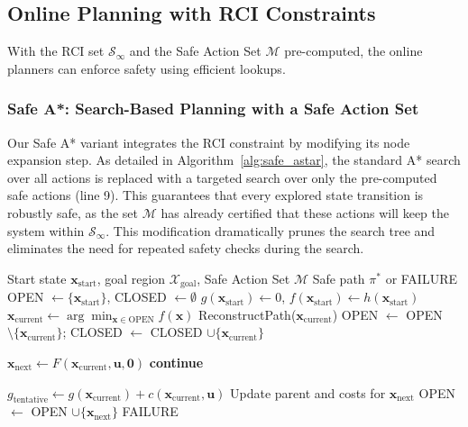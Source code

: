 \documentclass[conference]{IEEEtran}
\begin{document}
\subsection{Online Planning with RCI Constraints}
With the RCI set $\mathcal{S}_\infty$ and the Safe Action Set $\mathcal{M}$ pre-computed, the online planners can enforce safety using efficient lookups.

\subsubsection{Safe A*: Search-Based Planning with a Safe Action Set}
Our Safe A* variant integrates the RCI constraint by modifying its node expansion step.
As detailed in Algorithm~\ref{alg:safe_astar}, the standard A* search over all actions is replaced with a targeted search over only the pre-computed safe actions (line 9). This guarantees that every explored state transition is robustly safe, as the set $\mathcal{M}$ has already certified that these actions will keep the system within $\mathcal{S}_\infty$. This modification dramatically prunes the search tree and eliminates the need for repeated safety checks during the search.

\begin{algorithm}[t]
    \caption{Safe A* Algorithm}
    \label{alg:safe_astar}
    \begin{algorithmic}[1]
        \Require Start state $\mathbf{x}_{\text{start}}$, goal region $\mathcal{X}_{\text{goal}}$, Safe Action Set $\mathcal{M}$
        \Ensure Safe path $\pi^*$ or FAILURE
        \State OPEN $\gets \{\mathbf{x}_{\text{start}}\}$, CLOSED $\gets \emptyset$
        \State $g(\mathbf{x}_{\text{start}}) \gets 0$, $f(\mathbf{x}_{\text{start}}) \gets h(\mathbf{x}_{\text{start}})$
            \State $\mathbf{x}_{\text{current}} \gets \arg\min_{\mathbf{x} \in \text{OPEN}} f(\mathbf{x})$
             \Return ReconstructPath($\mathbf{x}_{\text{current}}$) \EndIf
            \State OPEN $\gets$ OPEN $\setminus \{\mathbf{x}_{\text{current}}\}$; 
            CLOSED $\gets$ CLOSED $\cup \{\mathbf{x}_{\text{current}}\}$
            
                \State $\mathbf{x}_{\text{next}} \gets F(\mathbf{x}_{\text{current}}, \mathbf{u}, \mathbf{0})$ 
                 \textbf{continue} \EndIf
                
                \State $g_{\text{tentative}} \gets g(\mathbf{x}_{\text{current}}) + c(\mathbf{x}_{\text{current}}, \mathbf{u})$
                    \State Update parent and costs for $\mathbf{x}_{\text{next}}$
                     \State OPEN $\gets$ OPEN $\cup \{\mathbf{x}_{\text{next}}\}$ \EndIf
                \EndIf
            \EndFor
        \EndWhile
        \State \Return FAILURE
    \end{algorithmic}
\end{algorithm}
\end{document}
